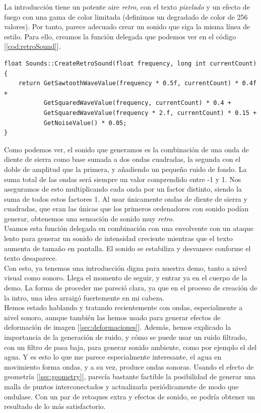 La introducción tiene un potente aire \emph{retro}, con el texto \emph{pixelado} y un efecto de fuego con una gama de color limitada (definimos un degradado de color de 256 valores). Por tanto, parece adecuado crear un sonido que siga la misma línea de estilo. Para ello, creamos la función delegada que podemos ver en el código [\ref{cod:retroSound}].\\

\begin{lstlisting}[style=C-color, caption={Generación de un sonido retro},label=cod:retroSound, escapechar=|]
float Sounds::CreateRetroSound(float frequency, long int currentCount)
{
    return GetSawtoothWaveValue(frequency * 0.5f, currentCount) * 0.4f +
           GetSquaredWaveValue(frequency, currentCount) * 0.4 +
           GetSquaredWaveValue(frequency * 2.f, currentCount) * 0.15 +
           GetNoiseValue() * 0.05;
}
\end{lstlisting}

Como podemos ver, el sonido que generamos es la combinación de una onda de diente de sierra como base sumada a dos ondas cuadradas, la segunda con el doble de amplitud que la primera, y añadiendo un pequeño ruido de fondo. La suma total de las ondas será siempre un valor comprendido entre -1 y 1. Nos aseguramos de esto multiplicando cada onda por un factor distinto, siendo la suma de todos estos factores 1. Al usar únicamente ondas de diente de sierra y cuadradas, que eran las únicas que los primeros ordenadores con sonido podían generar, obtenemos una sensación de sonido muy \emph{retro}.\\

Usamos esta función delegada en combinación con una envolvente con un ataque lento para generar un sonido de intensidad creciente mientras que el texto aumenta de tamaño en pantalla. El sonido se estabiliza y desvanece conforme el texto desaparece.\\

Con esto, ya tenemos una introducción digna para nuestra demo, tanto a nivel visual como sonoro. Llega el momento de seguir, y entrar ya en el cuerpo de la demo. La forma de proceder me pareció clara, ya que en el proceso de creación de la intro, una idea arraigó fuertemente en mi cabeza.\\

Hemos estado hablando y tratando recientemente con ondas, especialmente a nivel sonoro, aunque también las hemos usado para generar efectos de deformación de imagen [\ref{sec:deformaciones}]. Además, hemos explicado la importancia de la generación de ruido, y cómo se puede usar un ruido filtrado, con un filtro de pasa baja, para generar sonido ambiente, como por ejemplo el del agua. Y es esto lo que me parece especialmente interesante, el agua en movimiento forma ondas, y a su vez, produce ondas sonoras. Usando el efecto de geometría [\ref{sec:geometry}], parecía bastante factible la posibilidad de generar una malla de puntos interconectados y actualizarla periódicamente de modo que ondulase. Con un par de retoques extra y efectos de sonido, se podría obtener un resultado de lo más satisfactorio.\\

